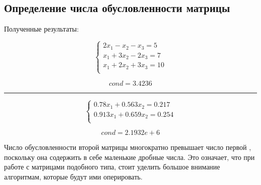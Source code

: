 \documentclass{article}
\begin{document}
\subsection{Определение числа обусловленности матрицы}
Полученные результаты:
\begin{multicols}{2}
\begin{displaymath}
  \left\{ \begin{array}{ll}
  2x_{1} - x_{2} - x_{3}= 5\\
  x_{1} + 3x_{2} - 2x_{3} = 7\\
  x_{1} + 2x_{2} + 3x_{3} = 10\\
\end{array} \right.
\end{displaymath}

\begin{displaymath}
  cond = 3.4236
\end{displaymath}
\end{multicols}
\rule[1mm]{10cm}{0.1mm}
\begin{multicols}{2}
\begin{displaymath}
  \left\{ \begin{array}{ll}
  0.78x_{1} + 0.563x_{2} = 0.217\\
  0.913x_{1} + 0.659x_{2} = 0.254\\
\end{array} \right.
\end{displaymath}

\begin{displaymath}
  cond = 2.1932e+6
\end{displaymath}
\end{multicols}
Число обусловленности второй матрицы многократно превышает число первой
, поскольку она содержить в себе маленькие дробные числа.
Это означает, что при работе с матрицами подобного типа, стоит уделить
большое внимание алгоритмам, которые будут ими оперировать.
\end{document}
